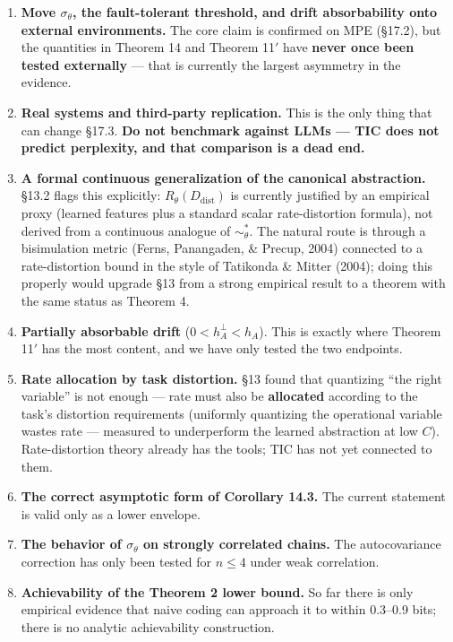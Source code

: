 \documentclass[11pt]{article}
\providecommand{\tightlist}{%
  \setlength{\itemsep}{0pt}\setlength{\parskip}{0pt}}
\begin{document}
\begin{enumerate}
\def\labelenumi{\arabic{enumi}.}
\tightlist
\item
  \textbf{Move \(\sigma_\theta\), the fault-tolerant threshold, and drift absorbability onto external environments.} The core claim is confirmed on MPE (\S{}17.2), but the quantities in Theorem 14 and Theorem 11\('\) have \textbf{never once been tested externally} --- that is currently the largest asymmetry in the evidence.
\item
  \textbf{Real systems and third-party replication.} This is the only thing that can change \S{}17.3. \textbf{Do not benchmark against LLMs --- TIC does not predict perplexity, and that comparison is a dead end.}
\item
  \textbf{A formal continuous generalization of the canonical abstraction.} \S{}13.2 flags this explicitly: \(R_\theta(D_{\mathrm{dist}})\) is currently justified by an empirical proxy (learned features plus a standard scalar rate-distortion formula), not derived from a continuous analogue of \(\sim_\theta^*\). The natural route is through a bisimulation metric (Ferns, Panangaden, \& Precup, 2004) connected to a rate-distortion bound in the style of Tatikonda \& Mitter (2004); doing this properly would upgrade \S{}13 from a strong empirical result to a theorem with the same status as Theorem 4.
\item
  \textbf{Partially absorbable drift} (\(0<h_A^\perp<h_A\)). This is exactly where Theorem 11\('\) has the most content, and we have only tested the two endpoints.
\item
  \textbf{Rate allocation by task distortion.} \S{}13 found that quantizing ``the right variable'' is not enough --- rate must also be \textbf{allocated} according to the task's distortion requirements (uniformly quantizing the operational variable wastes rate --- measured to underperform the learned abstraction at low \(C\)). Rate-distortion theory already has the tools; TIC has not yet connected to them.
\item
  \textbf{The correct asymptotic form of Corollary 14.3.} The current statement is valid only as a lower envelope.
\item
  \textbf{The behavior of \(\sigma_\theta\) on strongly correlated chains.} The autocovariance correction has only been tested for \(n\le4\) under weak correlation.
\item
  \textbf{Achievability of the Theorem 2 lower bound.} So far there is only empirical evidence that naive coding can approach it to within 0.3--0.9 bits; there is no analytic achievability construction.
\end{enumerate}
\end{document}
